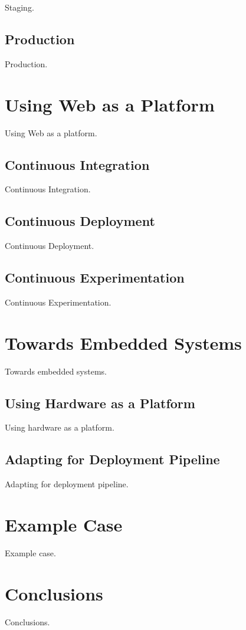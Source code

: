 \documentclass[english]{tktltiki2}
\begin{document}
Staging.

\subsection{Production}

Production.


\section{Using Web as a Platform}

Using Web as a platform.

\subsection{Continuous Integration}

Continuous Integration.

\subsection{Continuous Deployment}

Continuous Deployment.

\subsection{Continuous Experimentation}

Continuous Experimentation.


\section{Towards Embedded Systems}

Towards embedded systems.

\subsection{Using Hardware as a Platform}

Using hardware as a platform.

\subsection{Adapting for Deployment Pipeline}

Adapting for deployment pipeline.


\section{Example Case}

Example case.


\section{Conclusions}

Conclusions.




\end{document}
